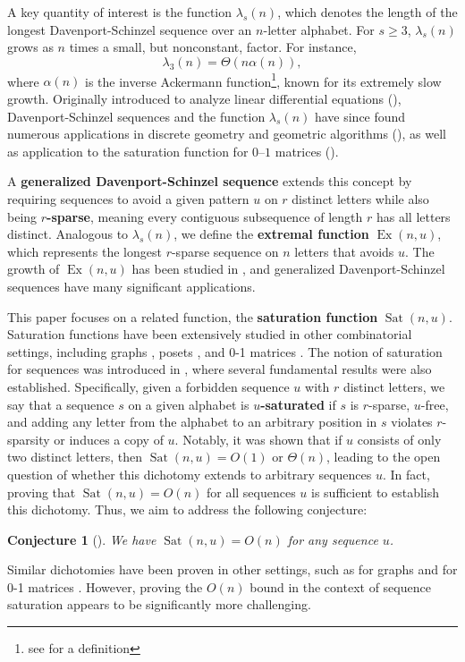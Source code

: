 \documentclass[12pt]{amsart}
\DeclareMathOperator{\Sat}{Sat}
\DeclareMathOperator{\Ex}{Ex}
\newtheorem{conj}{Conjecture}
\theoremstyle{definition}
\numberwithin{equation}{section}
\numberwithin{table}{thm}
\begin{document}
A key quantity of interest is the function $\lambda_s(n)$, which denotes the length of the longest Davenport-Schinzel sequence over an $n$-letter alphabet. For $s\ge 3$, $\lambda_s(n)$ grows as $n$ times a small, but nonconstant, factor. For instance, \[\lambda_3(n)=\Theta(n\alpha(n)),\] where $\alpha(n)$ is the inverse Ackermann function\footnote{see \cite{PETTIE20111863} for a definition}, known for its extremely slow growth. Originally introduced to analyze linear differential equations (\cite{davenportschinzel65}), Davenport-Schinzel sequences and the function $\lambda_s(n)$ have since found numerous applications in discrete geometry and geometric algorithms (\cite{Atallah85}), as well as application to the saturation function for $0$--$1$ matrices (\cite{Keszegh09}).

A \textbf{generalized Davenport-Schinzel sequence} extends this concept by requiring sequences to avoid a given pattern $u$ on $r$ distinct letters while also being $r$\textbf{-sparse}, meaning every contiguous subsequence
of length $r$ has all letters distinct. Analogous to $\lambda_s(n)$, we define the \textbf{extremal function} $\Ex(n,u)$, which represents the longest $r$-sparse sequence on $n$ letters that avoids $u$. The growth of $\Ex(n,u)$ has been studied in \cite{PETTIE20111863}, and generalized Davenport-Schinzel sequences have many significant applications.

This paper focuses on a related function, the \textbf{saturation function} $\Sat(n,u)$. Saturation functions have been extensively studied in other combinatorial settings, including graphs \cites{KászonyiTuzaGraphSaturation,DAMASDI2021103321}, posets \cite{Ferrara2017TheSN}, and 0-1 matrices \cite{Fulek2020SaturationPA}. The notion of saturation for sequences was introduced in \cite{ANAND2025382}, where several fundamental results were also established. Specifically, given a forbidden sequence $u$ with $r$ distinct letters, we say that a sequence $s$ on a given alphabet is \textbf{$u$-saturated} if $s$ is $r$-sparse, $u$-free, and adding any letter from the alphabet to an arbitrary position in $s$ violates $r$-sparsity or induces a copy of $u$. Notably, it was shown that if $u$ consists of only two distinct letters, then $\Sat(n,u)=O(1)$ or $\Theta(n)$, leading to the open question of whether this dichotomy extends to arbitrary sequences $u$. In fact, proving that $\Sat(n,u)=O(n)$ for all sequences $u$ is sufficient to establish this dichotomy. Thus, we aim to address the following conjecture:

\begin{conj}[\cite{ANAND2025382}]\label{conj: main}
    We have $\Sat(n,u) = O(n)$ for any sequence $u$.
\end{conj}
Similar dichotomies have been proven in other settings, such as for graphs \cite{KászonyiTuzaGraphSaturation} and for 0-1 matrices \cite{Fulek2020SaturationPA}. However, proving the $O(n)$ bound in the context of sequence saturation appears to be significantly more challenging. 
\end{document}
